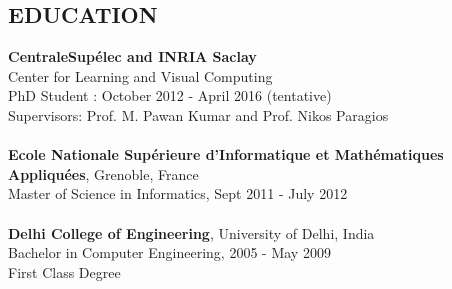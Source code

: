 \documentclass{res}
\begin{document}
        \begin{resume}


        \section{EDUCATION} 
{\bf CentraleSup\'elec and INRIA Saclay}\\ Center for Learning and Visual Computing\\ PhD Student : October 2012 - April 2016 (tentative)\\ Supervisors: Prof. M. Pawan Kumar and Prof. Nikos Paragios \\  \\
{\bf Ecole Nationale Sup\'erieure d'Informatique et Math\'ematiques Appliqu\'ees}, Grenoble, France  \\        
Master of Science in Informatics, Sept 2011 - July 2012   \\  \\
{\bf Delhi College of Engineering}, University of Delhi, India       \\   
Bachelor in Computer Engineering, 2005 - May 2009  \\        
First Class Degree          

\vspace{-5pt}

\end{resume}
\end{document}
